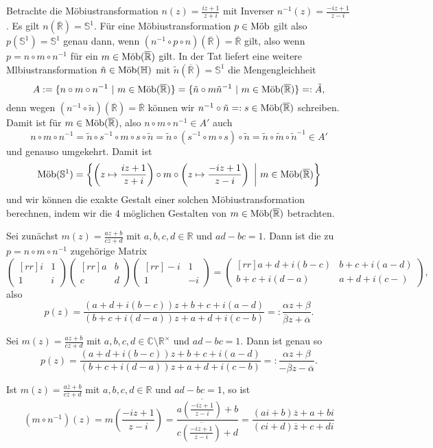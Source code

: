 \documentclass[11pt]{book}
\numberwithin{dummy}{section}
\theoremstyle{nonumberbreak}
\newenvironment{prob}[1][]{\ifthenelse{\equal{#1}{}}{\problem}{\problem[#1]}\rm}{\endproblem}
\newenvironment{sol}[1][]{\ifthenelse{\equal{#1}{}}{\solution}{\solution[#1]}\rm}{\endsolution}
\newcommand{\C}{\mathbb{C}}
\newcommand{\R}{\mathbb{R}}
\newcommand{\Sph}{\mathbb{S}}
\newcommand{\He}{\mathbb{H}}
\newcommand{\RR}{\overline{\mathbb{R}}}
\newcommand{\amob}{\textup{Möb}}
\newcommand{\matx}[4]{\begin{pmatrix}[rr]#1 & #2 \\[-6pt] #3 & #4 \end{pmatrix}}
\begin{document}
\begin{spacing}{1.4}
\begin{prob}
\begin{sol}
\begin{compactenum}
\item Betrachte die Möbiustransformation $n(z)=\frac{iz+1}{z+i}$ mit Inverser $n^{-1}(z)=\frac{-iz+1}{z-i}$. Es gilt $n(\RR)=\Sph^1$. Für eine Möbiustransformation $p \in \amob$ gilt also $p(\Sph^1) = \Sph^1$ genau dann, wenn $(n^{-1}\circ p \circ n)(\RR)=\RR$ gilt, also wenn $p=n\circ m \circ n^{-1}$ für ein $m \in \amob(\RR)$ gilt. In der Tat liefert eine weitere Mlbiustransformation $\tilde{n} \in \amob(\He)$ mit $\tilde{n}(\RR)=\Sph^1$ die Mengengleichheit
$$A:=\{n \circ m \circ n^{-1} \ \vert \ m \in \amob(\RR)\} = \{ \tilde{n} \circ m \tilde{n}^{-1} \ \vert \ m \in \amob(\RR) \}=:\tilde{A},$$
denn wegen $(n^{-1} \circ \tilde{n})(\RR)=\RR$ können wir $n^{-1}\circ \tilde{n} =:s \in \amob(\RR)$ schreiben. Damit ist für $m \in \amob(\RR)$, also $n \circ m \circ n^{-1} \in A'$ auch
$$n \circ m \circ n^{-1}=\tilde{n} \circ s^{-1} \circ m \circ s \circ \tilde{n} = \tilde{n} \circ (s^{-1} \circ m \circ s) \circ \tilde{n} = \tilde{n} \circ \tilde{m} \circ \tilde{n}^{-1} \in A'$$
und genauso umgekehrt. Damit ist 
$$\amob(\Sph^1) = \left\{ \left( z \mapsto \frac{iz+1}{z+i}\right) \circ m \circ \left( z \mapsto \frac{-iz+1}{z-i}\right) \ \bigg \vert \ m \in \amob(\RR) \right\}$$
und wir können die exakte Gestalt einer solchen Möbiustransformation berechnen, indem wir die 4 möglichen Gestalten von $m \in \amob(\RR)$ betrachten.
\begin{compactenum}
\item Sei zunächst $m(z)=\frac{az+b}{cz+d}$ mit $a,b,c,d \in \R$ und $ad-bc=1$. Dann ist die zu $p=n \circ m \circ n^{-1}$ zugehörige Matrix
$$\matx{i}{1}{1}{i} \matx{a}{b}{c}{d} \matx{-i}{1}{1}{-i} = \matx{a+d+i(b-c)}{b+c+i(a-d)}{b+c+i(d-a)}{a+d+i(c-)},$$
also 
$$p(z)= \frac{(a+d+i(b-c))z + b+ c+ i(a-d)}{(b+c+i(d-a))z + a+ d+ i (c-b)} =: \frac{\alpha z + \beta}{\overline{\beta} z + \overline{\alpha}}.$$
\item Sei $m(z)=\frac{az+b}{cz+d}$ mit $a,b,c,d \in \C \setminus \R^{\times}$ und $ad-bc=1$. Dann ist genau so 
$$p(z)= \frac{(a+d+i(b-c))z + b+ c+ i(a-d)}{(b+c+i(d-a))z + a+ d+ i (c-b)} =: \frac{\alpha z + \beta}{-\overline{\beta} z - \overline{\alpha}}.$$
\item Ist $m(z)=\frac{a\overline{z}+b}{c\overline{z}+d}$ mit $a,b,c,d \in \R$ und $ad-bc=1$, so ist
$$(m \circ n^{-1})(z) = m\left(\frac{-iz+1}{z-i}\right) = \frac{a \overline{\left( \frac{-iz+1}{z-i}\right)} + b}{c \overline{\left( \frac{-iz+1}{z-i}\right)} + d} = \frac{(ai+b) \overline{z} + a+bi}{(ci+d)\overline{z} + c + di}$$

\end{compactenum}
\end{compactenum}
\end{sol}
\end{prob}
\end{spacing}
\end{document}
